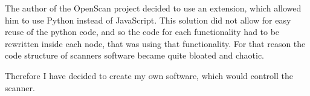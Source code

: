 The author of the OpenScan project decided to use an extension, which allowed him to use Python instead of JavaScript.
This solution did not allow for easy reuse of the python code, and so the code for each functionality had to be rewritten inside each node, that was using that functionality.
For that reason the code structure of scanners software became quite bloated and chaotic.

Therefore I have decided to create my own software, which would controll the scanner.



\endinput